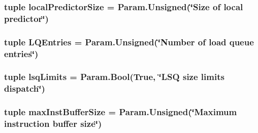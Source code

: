\label{classOzoneCPU_1_1DerivOzoneCPU_a711db16eca8627517aca59fb2aa5565b}
\hypertarget{classOzoneCPU_1_1DerivOzoneCPU_ac2af65faa5d32c894af40e4477fbfe65}{
\subsubsection[{localPredictorSize}]{\setlength{\rightskip}{0pt plus 5cm}tuple {\bf localPredictorSize} = Param.Unsigned(\char`\"{}Size of local predictor\char`\"{})}}
\label{classOzoneCPU_1_1DerivOzoneCPU_ac2af65faa5d32c894af40e4477fbfe65}
\hypertarget{classOzoneCPU_1_1DerivOzoneCPU_ae14ed73e842c3580d021c73c0e2b5aaf}{
\subsubsection[{LQEntries}]{\setlength{\rightskip}{0pt plus 5cm}tuple {\bf LQEntries} = Param.Unsigned(\char`\"{}Number of load queue entries\char`\"{})}}
\label{classOzoneCPU_1_1DerivOzoneCPU_ae14ed73e842c3580d021c73c0e2b5aaf}
\hypertarget{classOzoneCPU_1_1DerivOzoneCPU_a817ec7e355e3f6da8580c48725c85632}{
\subsubsection[{lsqLimits}]{\setlength{\rightskip}{0pt plus 5cm}tuple {\bf lsqLimits} = Param.Bool(True, \char`\"{}LSQ size limits dispatch\char`\"{})}}
\label{classOzoneCPU_1_1DerivOzoneCPU_a817ec7e355e3f6da8580c48725c85632}
\hypertarget{classOzoneCPU_1_1DerivOzoneCPU_a7bef7a8f745bad1c4151dadaef30c4f7}{
\subsubsection[{maxInstBufferSize}]{\setlength{\rightskip}{0pt plus 5cm}tuple {\bf maxInstBufferSize} = Param.Unsigned(\char`\"{}Maximum instruction buffer size\char`\"{})}}
